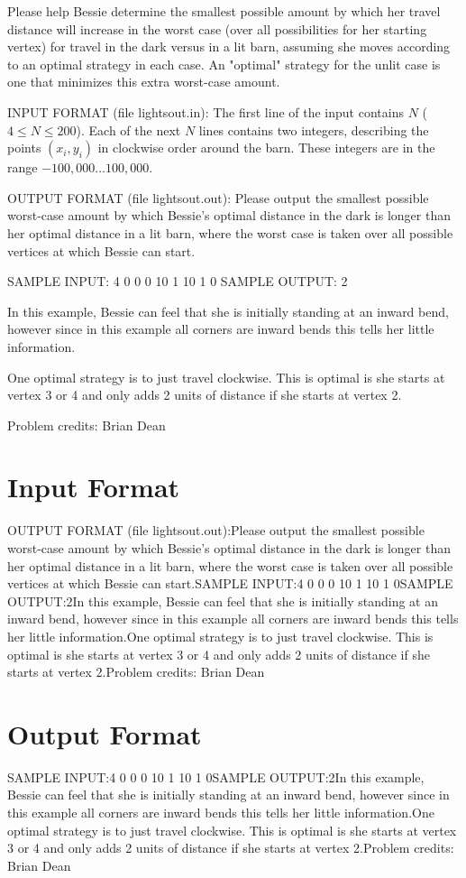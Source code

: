 \documentclass[12pt]{article}
\begin{document}
Please help Bessie determine the smallest possible amount by which
her travel distance will increase in the worst case (over all
possibilities for her starting vertex) for travel in the dark versus
in a lit barn, assuming she moves according to an optimal strategy in
each case.  An "optimal" strategy for the unlit case is one that
minimizes this extra worst-case amount.  

INPUT FORMAT (file lightsout.in):
The first line of the input contains $N$ ($4 \leq N \leq 200$).  Each of the
next $N$ lines contains two integers, describing the points $(x_i, y_i)$ in
clockwise order around the barn.  These integers are in the range
$-100,000 \ldots 100,000$.

OUTPUT FORMAT (file lightsout.out):
Please output the smallest possible worst-case amount by which
Bessie's optimal distance in the dark is longer than her optimal
distance in a lit barn, where the worst case is taken over all
possible vertices at which Bessie can start.

SAMPLE INPUT:
4
0 0
0 10
1 10
1 0
SAMPLE OUTPUT: 
2

In this example, Bessie can feel that she is initially standing at an inward
bend, however since in this example all corners are inward bends this tells her
little information.

One optimal strategy is to just travel clockwise.  This is optimal is she starts at vertex 3 or 4 and only adds 2 units of distance if she starts at vertex 2.

Problem credits: Brian Dean



\section*{Input Format}
OUTPUT FORMAT (file lightsout.out):Please output the smallest possible worst-case amount by which
Bessie's optimal distance in the dark is longer than her optimal
distance in a lit barn, where the worst case is taken over all
possible vertices at which Bessie can start.SAMPLE INPUT:4
0 0
0 10
1 10
1 0SAMPLE OUTPUT:2In this example, Bessie can feel that she is initially standing at an inward
bend, however since in this example all corners are inward bends this tells her
little information.One optimal strategy is to just travel clockwise.  This is optimal is she starts at vertex 3 or 4 and only adds 2 units of distance if she starts at vertex 2.Problem credits: Brian Dean

\section*{Output Format}
SAMPLE INPUT:4
0 0
0 10
1 10
1 0SAMPLE OUTPUT:2In this example, Bessie can feel that she is initially standing at an inward
bend, however since in this example all corners are inward bends this tells her
little information.One optimal strategy is to just travel clockwise.  This is optimal is she starts at vertex 3 or 4 and only adds 2 units of distance if she starts at vertex 2.Problem credits: Brian Dean
\end{document}
